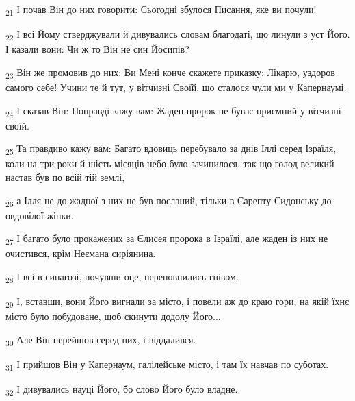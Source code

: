 \begin{tcolorbox}
\textsubscript{21} І почав Він до них говорити: Сьогодні збулося Писання, яке ви почули!
\end{tcolorbox}
\begin{tcolorbox}
\textsubscript{22} І всі Йому стверджували й дивувались словам благодаті, що линули з уст Його. І казали вони: Чи ж то Він не син Йосипів?
\end{tcolorbox}
\begin{tcolorbox}
\textsubscript{23} Він же промовив до них: Ви Мені конче скажете приказку: Лікарю, уздоров самого себе! Учини те й тут, у вітчизні Своїй, що сталося чули ми у Капернаумі.
\end{tcolorbox}
\begin{tcolorbox}
\textsubscript{24} І сказав Він: Поправді кажу вам: Жаден пророк не буває приємний у вітчизні своїй.
\end{tcolorbox}
\begin{tcolorbox}
\textsubscript{25} Та правдиво кажу вам: Багато вдовиць перебувало за днів Іллі серед Ізраїля, коли на три роки й шість місяців небо було зачинилося, так що голод великий настав був по всій тій землі,
\end{tcolorbox}
\begin{tcolorbox}
\textsubscript{26} а Ілля не до жадної з них не був посланий, тільки в Сарепту Сидонську до овдовілої жінки.
\end{tcolorbox}
\begin{tcolorbox}
\textsubscript{27} І багато було прокажених за Єлисея пророка в Ізраїлі, але жаден із них не очистився, крім Неємана сиріянина.
\end{tcolorbox}
\begin{tcolorbox}
\textsubscript{28} І всі в синагозі, почувши оце, переповнились гнівом.
\end{tcolorbox}
\begin{tcolorbox}
\textsubscript{29} І, вставши, вони Його вигнали за місто, і повели аж до краю гори, на якій їхнє місто було побудоване, щоб скинути додолу Його...
\end{tcolorbox}
\begin{tcolorbox}
\textsubscript{30} Але Він перейшов серед них, і віддалився.
\end{tcolorbox}
\begin{tcolorbox}
\textsubscript{31} І прийшов Він у Капернаум, галілейське місто, і там їх навчав по суботах.
\end{tcolorbox}
\begin{tcolorbox}
\textsubscript{32} І дивувались науці Його, бо слово Його було владне.
\end{tcolorbox}

